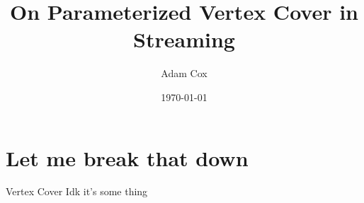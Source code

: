 \documentclass{beamer}
\title{On Parameterized Vertex Cover in Streaming}
\date{\today}
\author{Adam Cox}
\institute{University of Birmingham}
\begin{document}
\maketitle

\section{Let me break that down}

\begin{frame}{Vertex Cover}
    Idk it's some thing
\end{frame}
\end{document}
